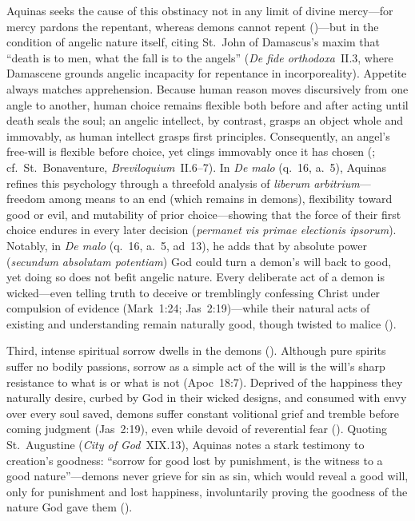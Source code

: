 Aquinas seeks the cause of this obstinacy not in any limit of divine mercy---for mercy pardons the repentant, whereas demons cannot repent ()---but in the condition of angelic nature itself, citing St.~John of Damascus's maxim that ``death is to men, what the fall is to the angels'' (\emph{De fide orthodoxa}~II.3, where Damascene grounds angelic incapacity for repentance in incorporeality). Appetite always matches apprehension. Because human reason moves discursively from one angle to another, human choice remains flexible both before and after acting until death seals the soul; an angelic intellect, by contrast, grasps an object whole and immovably, as human intellect grasps first principles. Consequently, an angel's free-will is flexible before choice, yet clings immovably once it has chosen (; cf.~St.~Bonaventure, \emph{Breviloquium}~II.6--7). In \emph{De malo} (q.~16, a.~5), Aquinas refines this psychology through a threefold analysis of \emph{liberum arbitrium}---freedom among means to an end (which remains in demons), flexibility toward good or evil, and mutability of prior choice---showing that the force of their first choice endures in every later decision (\emph{permanet vis primae electionis ipsorum}). Notably, in \emph{De malo} (q.~16, a.~5, ad~13), he adds that by absolute power (\emph{secundum absolutam potentiam}) God could turn a demon's will back to good, yet doing so does not befit angelic nature. Every deliberate act of a demon is wicked---even telling truth to deceive or tremblingly confessing Christ under compulsion of evidence (Mark~1:24; Jas~2:19)---while their natural acts of existing and understanding remain naturally good, though twisted to malice ().

Third, intense spiritual sorrow dwells in the demons (). Although pure spirits suffer no bodily passions, sorrow as a simple act of the will is the will's sharp resistance to what is or what is not (Apoc~18:7). Deprived of the happiness they naturally desire, curbed by God in their wicked designs, and consumed with envy over every soul saved, demons suffer constant volitional grief and tremble before coming judgment (Jas~2:19), even while devoid of reverential fear (). Quoting St.~Augustine (\emph{City of God}~XIX.13), Aquinas notes a stark testimony to creation's goodness: ``sorrow for good lost by punishment, is the witness to a good nature''---demons never grieve for sin as sin, which would reveal a good will, only for punishment and lost happiness, involuntarily proving the goodness of the nature God gave them ().

